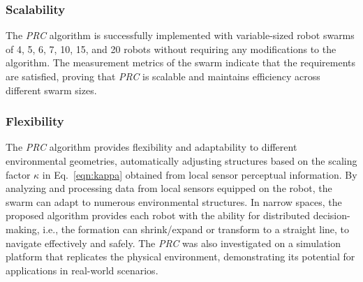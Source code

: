 \subsubsection{Scalability}
The \textit{PRC} algorithm is successfully implemented with variable-sized robot swarms of 4, 5, 6, 7, 10, 15, and 20 robots without requiring any modifications to the algorithm. The measurement metrics of the swarm indicate that the requirements are satisfied, proving that \textit{PRC} is scalable and maintains efficiency across different swarm sizes. 

\subsubsection{Flexibility}
The \textit{PRC} algorithm provides flexibility and adaptability to different environmental geometries, automatically adjusting structures based on the scaling factor $\kappa$ in Eq.~\eqref{eqn:kappa} obtained from local sensor perceptual information. By analyzing and processing data from local sensors equipped on the robot, the swarm can adapt to numerous environmental structures. In narrow spaces, the proposed algorithm provides each robot with the ability for distributed decision-making, i.e., the formation can shrink/expand or transform to a straight line, to navigate effectively and safely. The \textit{PRC} was also investigated on a simulation platform that replicates the physical environment, demonstrating its potential for applications in real-world scenarios.